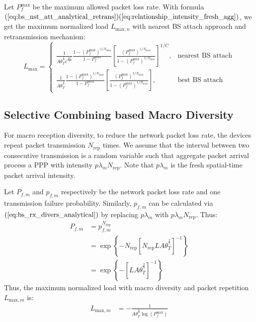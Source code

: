Let $P_{f}^{\text{max}}$ be the maximum allowed packet loss rate. 
With formula $(\ref{eq:bs_nst_att_analytical_retrans})(\ref{eq:relationship_intensity_fresh_agg})$, we get the maximum normalized load $L_{\text{max},n}$ with nearest BS attach approach and retransmission mechanism:
\[
L_{\text{max}}=\left\{
\begin{array}{ll}
\frac{1}{ A \theta_{T}^{\frac{2}{\gamma}} e^{\frac{2\sigma^2}{\gamma^2}} } \frac{1-(P_{f}^{\text{max}})^{1/N_{\text{max}}} }{1-P_{f}^{\text{max}}} \left[ \frac{ \left( P_{f}^{\text{max}}\right) ^{1/N_{\text{max}}} }{1-(P_{f}^{\text{max}})^{1/N_{\text{max}}}}\right]  ^{1/C}, & \text{nearest BS attach}\\
\frac{1}{ A \theta_{T}^{\frac{2}{\gamma}}  } \frac{1-(P_{f}^{\text{max}})^{1/N_{\text{max}}} }{1-P_{f}^{\text{max}}} \left[ \frac{ \left( P_{f}^{\text{max}}\right) ^{1/N_{\text{max}}} }{1-(P_{f}^{\text{max}})^{1/N_{\text{max}}}}\right], & \text{best BS attach}
\end{array}
\right.
\]

\subsection{Selective Combining based Macro Diversity}
For macro reception diversity, to reduce the network packet loss rate, the devices repeat packet transmission $N_{\text{rep}}$ times. We assume that the interval between two consecutive transmission is a random variable such that aggregate packet arrival process a PPP with intensity $p\lambda_{m}N_{\text{rep}}$. Note that $p\lambda_{m}$ is the fresh spatial-time packet arrival intensity.

Let $P_{f, m}$ and $p_{f, m}$ respectively be the network packet loss rate and one transmission failure probability. Similarly,  $p_{f, m}$ can be calculated via $(\ref{eq:bs_rx_divers_analytical})$ by replacing $p\lambda_{m}$ with $p\lambda_{m}N_{\text{rep}}$.
Thus:
\begin{align}
	P_{f, m} &= p_{f, m} ^ {N_{\text{rep}}} \nonumber\\
	&= \exp\left\lbrace -N_{\text{rep}}\left[ N_{\text{rep}} L A \theta_{T}^{\frac{2}{\gamma}} \right] ^{-1}\right\rbrace \nonumber\\
	&=\exp\left\lbrace - \left[ L A \theta_{T}^{\frac{2}{\gamma}} \right] ^{-1}\right\rbrace
\end{align}
Thus, the maximum normalized load with macro diversity and packet repetition $L_{\text{max},m} $ is:
\begin{align}
\label{eq:bs_rx_divers_max_load_rep}
L_{\text{max},m} &= -\frac{1}{A \theta_{T}^{\frac{2}{\gamma}}\log(P_{f}^{\text{max}})}
\end{align}


